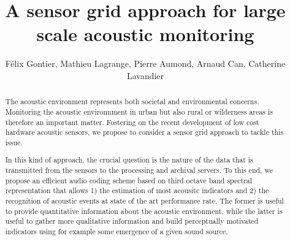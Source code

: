 \documentclass[final,3p,times,twocolumn]{elsarticle}
\begin{document}
\begin{frontmatter}




\title{A sensor grid approach for large scale acoustic monitoring}


\author{F\'elix Gontier, Mathieu Lagrange, Pierre Aumond, Arnaud Can, Catherine Lavandier}

\address{felix.gontier@reseau.eseo.fr}

\begin{abstract}

The acoustic environment represents both societal and environmental concerns. Monitoring the acoustic environnment in urban but also rural or wilderness areas is therefore an important matter. Fostering on the recent development of low cost hardware acoustic sensors, we propose to consider a sensor grid approach to tackle this issue.

In this kind of approach, the crucial question is the nature of the data that is transmitted from the sensors to the processing and archival servers. To this end, we propose an efficient audio coding scheme based on third octave band spectral representation that allows 1) the estimation of most acousitc indicators and 2) the recognition of acoustic events at state of the art performance rate. The former is useful to provide quantitative information about the acoustic environment, while the latter is useful to gather more qualitative information and build perceptually motivated indicators using for example some emergence of a given sound source.


\end{abstract}
\end{frontmatter}
\end{document}
